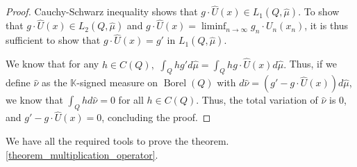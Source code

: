 \documentclass{amsart}
\theoremstyle{definition}
\theoremstyle{remark}
\def \Borel{\operatorname{Borel}}
\def \HMU{\hat{\mu}}
\def \HU{\hat{U}}
\begin{document}
\begin{proof}
	Cauchy-Schwarz inequality shows that $g\cdot \HU(x)\in L_1(Q,\HMU).$ To show that $g\cdot \HU(x)\in L_2(Q,\HMU)$ and $g\cdot \HU(x)=\liminf_{n\rightarrow\infty} g_n\cdot U_n(x_n)$, it is thus sufficient to show that $g\cdot \HU(x)=g'$ in $L_1(Q,\HMU).$
	
	We know that for any $h\in C(Q),$ $\int_{Q}hg'd\HMU=\int_{Q}hg\cdot\HU(x)d\HMU.$ Thus, if we define $\hat{\nu}$ as the $\mathbb{K}$-signed measure on $\Borel(Q)$ with $d\hat{\nu}=(g'-g\cdot\HU(x))d\HMU$, we know that $\int_{Q}h d\hat{\nu}=0$ for all $h\in C(Q).$ Thus, the total variation of $\hat{\nu}$ is $0$, and $g'-g\cdot\HU(x)=0$, concluding the proof.
\end{proof}

We have  all the required tools to prove the theorem. \ref{theorem_multiplication_operator}. 
\end{document}
